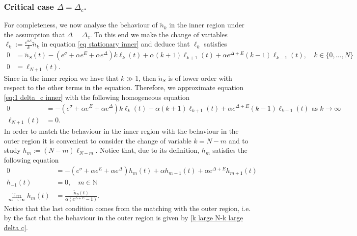 \documentclass{article}
\numberwithin{equation}{section}
\theoremstyle{plain}
\begin{document}
\subsubsection{Critical case $\Delta = \Delta_c $.}
For completeness, we now analyse the behaviour of $\tilde{n}_k $
in the inner region under the assumption that $\Delta = \Delta_c$.
To this end we make the change of variables $\ell_k := \frac{ e^{k E}}{k} \tilde{n}_k $ in equation \eqref{eq stationary inner}
 and deduce that $\ell_k $ satisfies 
\begin{align} \label{eq:1 delta_c inner}
       0 &= \tilde{n}_S (t) - \left( e^{\sigma } + \alpha e^E + \alpha e^\Delta  \right)  k \ell_k (t) + \alpha (k+1) \ell_{k+1} (t) + \alpha e^{\Delta+E} (k-1) \ell_{k-1} (t), \quad k \in \{ 0, \dots, N \}  \\
       0 &=\ell_{N+1} (t). \nonumber 
\end{align}
Since in the inner region we have that $k \gg 1 $, then $\tilde{n}_S $ is of lower order with respect to the other terms in the equation. Therefore, we approximate equation \eqref{eq:1 delta_c inner} with the following homogeneous equation 
\begin{align} \label{eq: delta_c inner homogeneous}
       0 &= - \left( e^{\sigma } + \alpha e^E + \alpha e^\Delta  \right)  k \ell_k  (t) + \alpha (k+1) \ell_{k+1} (t)  + \alpha e^{\Delta+E} (k-1) \ell_{k-1}  (t) \text{ as } k \to \infty \\
       \ell_{N+1}(t) &=0. \nonumber  
\end{align}
In order to match the behaviour in the inner region with the behaviour in the outer region it is convenient to consider the change of variable $k = N-m $ and to study $h_{m} := (N-m) \ell _{N-m} $. Notice that, due to its definition, $h_{m}$ satisfies the following equation 
\begin{align} \label{eq: delta_c inner homogeneous m}
       0 &=  - \left( e^{\sigma } + \alpha e^E + \alpha e^\Delta  \right)  h_m(t)   + \alpha h_{m-1} (t) + \alpha e^{\Delta+E} h_{m+1} (t) \\
       h_{-1}(t)&=0, \quad m \in \mathbb N \nonumber \\
       \lim_{m \to \infty } h_m (t) &= \frac{ \tilde{n}_S(t)  }{\alpha (e^{\Delta + E } -1 ) } \nonumber. 
\end{align}
Notice that the last condition comes from the matching with the outer region, i.e. by the fact that the behaviour in the outer region is given by \eqref{k large N-k large delta c}. 
\end{document}
